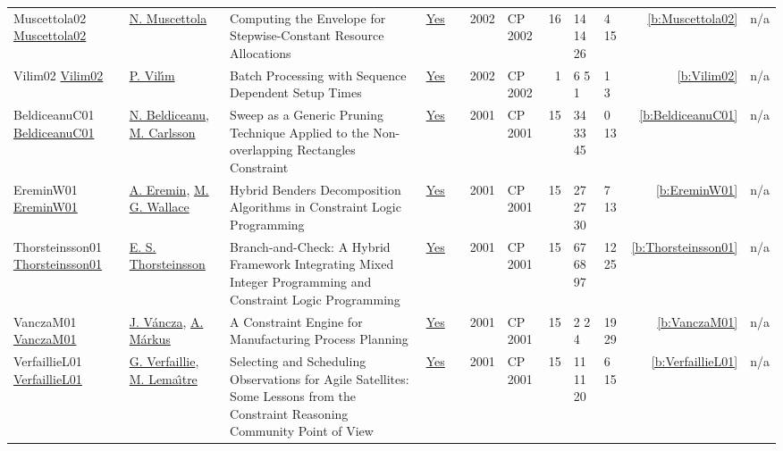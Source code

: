 {\begin{longtable}{>{\raggedright\arraybackslash}p{3cm}>{\raggedright\arraybackslash}p{4.5cm}>{\raggedright\arraybackslash}p{6.0cm}rrrp{2.5cm}rp{1cm}p{1cm}rr}
Muscettola02 \href{https://doi.org/10.1007/3-540-46135-3_10}{Muscettola02} & \hyperref[auth:a289]{N. Muscettola} & \cellcolor{green!10}Computing the Envelope for Stepwise-Constant Resource Allocations & \href{../works/Muscettola02.pdf}{Yes} & \cite{Muscettola02} & 2002 & CP 2002 & 16 & 14 14 26 & 4 15 & \ref{b:Muscettola02} & n/a\\
Vilim02 \href{https://doi.org/10.1007/3-540-46135-3_62}{Vilim02} & \hyperref[auth:a121]{P. Vil{\'{\i}}m} & Batch Processing with Sequence Dependent Setup Times & \href{../works/Vilim02.pdf}{Yes} & \cite{Vilim02} & 2002 & CP 2002 & 1 & 6 5 1 & 1 3 & \ref{b:Vilim02} & n/a\\
BeldiceanuC01 \href{https://doi.org/10.1007/3-540-45578-7_26}{BeldiceanuC01} & \hyperref[auth:a128]{N. Beldiceanu}, \hyperref[auth:a91]{M. Carlsson} & \cellcolor{green!10}Sweep as a Generic Pruning Technique Applied to the Non-overlapping Rectangles Constraint & \href{../works/BeldiceanuC01.pdf}{Yes} & \cite{BeldiceanuC01} & 2001 & CP 2001 & 15 & 34 33 45 & 0 13 & \ref{b:BeldiceanuC01} & n/a\\
EreminW01 \href{https://doi.org/10.1007/3-540-45578-7_1}{EreminW01} & \hyperref[auth:a1049]{A. Eremin}, \hyperref[auth:a117]{M. G. Wallace} & Hybrid Benders Decomposition Algorithms in Constraint Logic Programming & \href{../works/EreminW01.pdf}{Yes} & \cite{EreminW01} & 2001 & CP 2001 & 15 & 27 27 30 & 7 13 & \ref{b:EreminW01} & n/a\\
Thorsteinsson01 \href{https://doi.org/10.1007/3-540-45578-7_2}{Thorsteinsson01} & \hyperref[auth:a874]{E. S. Thorsteinsson} & Branch-and-Check: {A} Hybrid Framework Integrating Mixed Integer Programming and Constraint Logic Programming & \href{../works/Thorsteinsson01.pdf}{Yes} & \cite{Thorsteinsson01} & 2001 & CP 2001 & 15 & 67 68 97 & 12 25 & \ref{b:Thorsteinsson01} & n/a\\
VanczaM01 \href{https://doi.org/10.1007/3-540-45578-7_60}{VanczaM01} & \hyperref[auth:a278]{J. V{\'{a}}ncza}, \hyperref[auth:a294]{A. M{\'{a}}rkus} & A Constraint Engine for Manufacturing Process Planning & \href{../works/VanczaM01.pdf}{Yes} & \cite{VanczaM01} & 2001 & CP 2001 & 15 & 2 2 4 & 19 29 & \ref{b:VanczaM01} & n/a\\
VerfaillieL01 \href{https://doi.org/10.1007/3-540-45578-7_55}{VerfaillieL01} & \hyperref[auth:a173]{G. Verfaillie}, \hyperref[auth:a172]{M. Lema{\^{\i}}tre} & Selecting and Scheduling Observations for Agile Satellites: Some Lessons from the Constraint Reasoning Community Point of View & \href{../works/VerfaillieL01.pdf}{Yes} & \cite{VerfaillieL01} & 2001 & CP 2001 & 15 & 11 11 20 & 6 15 & \ref{b:VerfaillieL01} & n/a\\

\end{longtable}}

